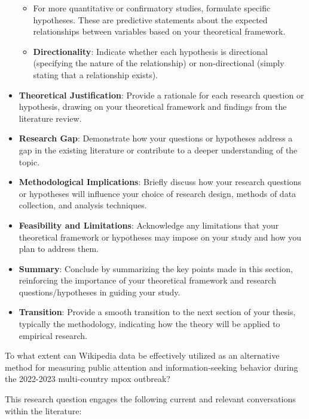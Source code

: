 \documentclass[
  12pt,
]{article}
\begin{document}
\begin{itemize}
  \begin{itemize}
  \item
    For more quantitative or confirmatory studies, formulate specific
    hypotheses. These are predictive statements about the expected
    relationships between variables based on your theoretical framework.
  \item
    \textbf{Directionality}: Indicate whether each hypothesis is
    directional (specifying the nature of the relationship) or
    non-directional (simply stating that a relationship exists).
  \end{itemize}
\item
  \textbf{Theoretical Justification}: Provide a rationale for each
  research question or hypothesis, drawing on your theoretical framework
  and findings from the literature review.
\item
  \textbf{Research Gap}: Demonstrate how your questions or hypotheses
  address a gap in the existing literature or contribute to a deeper
  understanding of the topic.
\end{itemize}

\begin{itemize}
\item
  \textbf{Methodological Implications}: Briefly discuss how your
  research questions or hypotheses will influence your choice of
  research design, methods of data collection, and analysis techniques.
\item
  \textbf{Feasibility and Limitations}: Acknowledge any limitations that
  your theoretical framework or hypotheses may impose on your study and
  how you plan to address them.
\item
  \textbf{Summary}: Conclude by summarizing the key points made in this
  section, reinforcing the importance of your theoretical framework and
  research questions/hypotheses in guiding your study.
\item
  \textbf{Transition}: Provide a smooth transition to the next section
  of your thesis, typically the methodology, indicating how the theory
  will be applied to empirical research.
\end{itemize}

To what extent can Wikipedia data be effectively utilized as an
alternative method for measuring public attention and
information-seeking behavior during the 2022-2023 multi-country mpox
outbreak?

This research question engages the following current and relevant
conversations within the literature:
\end{document}
